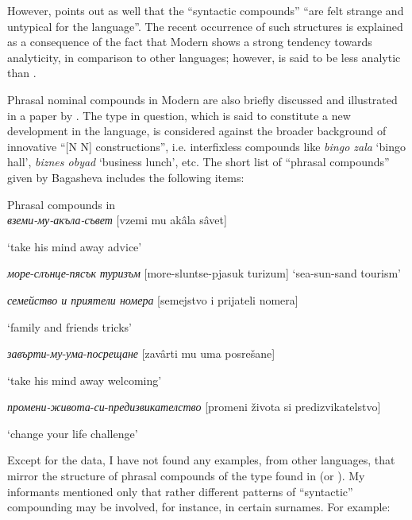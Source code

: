 \documentclass[output=paper]{LSP/langsci}
\begin{document}
However, \citet{Boyadzhieva2007} points out as well that the “syntactic compounds” “are felt strange and untypical for the  language”. The recent occurrence of such structures is explained as a consequence of the fact that Modern  shows a strong tendency towards analyticity, in comparison to other  languages; however,  is said to be less analytic than . 

{Phrasal nominal compounds in Modern  are also briefly discussed and illustrated in a paper by \citet{Bagasheva2015}. The type in question, which is said to constitute a new development in the language, is considered against the broader background of innovative “[N N] constructions”, i.e. interfixless compounds like} {\textit{bingo zala}} {‘bingo hall’,} {\textit{biznes obyad}} {‘business lunch’, etc. The short list of “phrasal compounds” given by Bagasheva includes the following items:}

\ea%
    \label{ex:szymanek:23} 

Phrasal compounds in  \citep{Bagasheva2015}\\

{\textit{{вземи-му-акъла-съвет}}} [vzemi mu akâla sâvet] 

‘take his mind away advice’

{\textit{{море}}}{-}{\textit{{слънце}}}{-}{\textit{{пясък}}} {\textit{{туризъм}}} [more-sluntse-pjasuk turizum] 
‘sea-sun-sand tourism’

{\textit{{семейство и приятели номера}}} [semejstvo i prijateli nomera] 

‘family and friends tricks’ 

{\textit{{завърти}}}{-}{\textit{{му}}}{-}{\textit{{ума}}}{-}{\textit{{посрещане}}} [zavârti mu uma posrešane] 

‘take his mind away welcoming’

{\textit{{промени-живота}}}{-}{\textit{{си}}}{-}{\textit{{предизвикателство}}} [promeni života si predizvikatelstvo] 

‘change   your life challenge’
\z

Except for the  data, I have not found any examples, from other  languages, that mirror the structure of phrasal compounds of the type found in  (or ). My informants mentioned only that rather different patterns of “syntactic” compounding may be involved, for instance, in certain surnames. For example:
\end{document}

